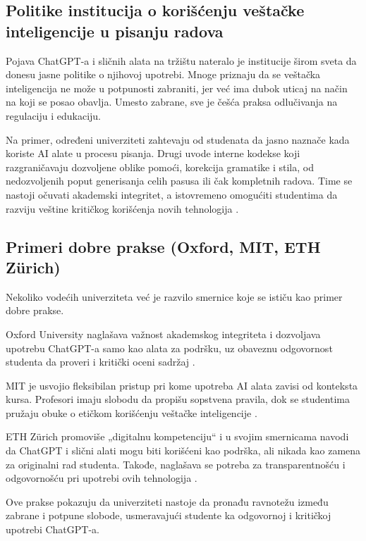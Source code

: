 \documentclass[12pt]{article}
\begin{document}
\subsection{Politike institucija o korišćenju veštačke inteligencije u pisanju radova}

Pojava ChatGPT-a i sličnih alata na tržištu nateralo je institucije širom sveta da donesu jasne politike o njihovoj upotrebi. Mnoge priznaju da se veštačka inteligencija ne može u potpunosti zabraniti, jer već ima dubok uticaj na način na koji se posao obavlja. Umesto zabrane, sve je češća praksa odlučivanja na regulaciju i edukaciju.

Na primer, određeni univerziteti zahtevaju od studenata da jasno naznače kada koriste AI alate u procesu pisanja. Drugi uvode interne kodekse koji razgraničavaju dozvoljene oblike pomoći, korekcija gramatike i stila, od nedozvoljenih poput generisanja celih pasusa ili čak kompletnih radova. Time se nastoji očuvati akademski integritet, a istovremeno omogućiti studentima da razviju veštine kritičkog korišćenja novih tehnologija \cite{baig2024systematic}.

\subsection{Primeri dobre prakse (Oxford, MIT, ETH Zürich)}

Nekoliko vodećih univerziteta već je razvilo smernice koje se ističu kao primer dobre prakse.

Oxford University naglašava važnost akademskog integriteta i dozvoljava upotrebu ChatGPT-a samo kao alata za podršku, uz obaveznu odgovornost studenta da proveri i kritički oceni sadržaj \cite{oxford2023guidelines}.

MIT je usvojio fleksibilan pristup pri kome upotreba AI alata zavisi od konteksta kursa. Profesori imaju slobodu da propišu sopstvena pravila, dok se studentima pružaju obuke o etičkom korišćenju veštačke inteligencije \cite{mit2023ai}.

ETH Zürich promoviše „digitalnu kompetenciju“ i u svojim smernicama navodi da ChatGPT i slični alati mogu biti korišćeni kao podrška, ali nikada kao zamena za originalni rad studenta. Takođe, naglašava se potreba za transparentnošću i odgovornošću pri upotrebi ovih tehnologija \cite{ethz2023ai}.

Ove prakse pokazuju da univerziteti nastoje da pronađu ravnotežu između zabrane i potpune slobode, usmeravajući studente ka odgovornoj i kritičkoj upotrebi ChatGPT-a.
\end{document}
